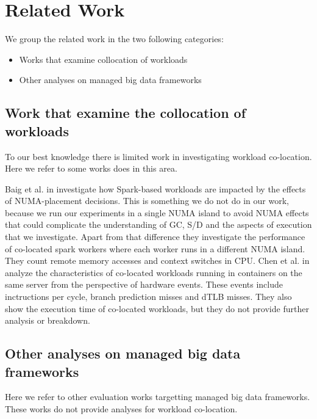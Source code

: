 \section{Related Work}

We group the related work in the two following categories:
\begin{itemize}
\item{Works that examine collocation of workloads}
\item{Other analyses on managed big data frameworks}
\end{itemize}

\subsection{Work that examine the collocation of workloads}
To our best knowledge there is limited work in investigating workload co-location. Here we refer to some works does in this area.

Baig et al. in \cite{NUMA} investigate how Spark-based workloads are impacted by the effects of NUMA-placement decisions. This is something we do not do in our work, because we run our experiments in a single NUMA island to avoid NUMA effects that could complicate the understanding of GC, S/D and the aspects of execution that we investigate. Apart from that difference they investigate the performance of co-located spark workers where each worker runs in a different NUMA island. They count remote memory accesses and context switches in CPU. Chen et al. in \cite{interference} analyze the characteristics of co-located workloads running in containers on the same server from the perspective of hardware events. These events include inctructions per cycle, branch prediction misses and dTLB misses. They also show the execution time of co-located workloads, but they do not provide further analysis or breakdown.

\subsection{Other analyses on managed big data frameworks}

Here we refer to other evaluation works targetting managed big data frameworks.
These works do not provide analyses for workload co-location.

